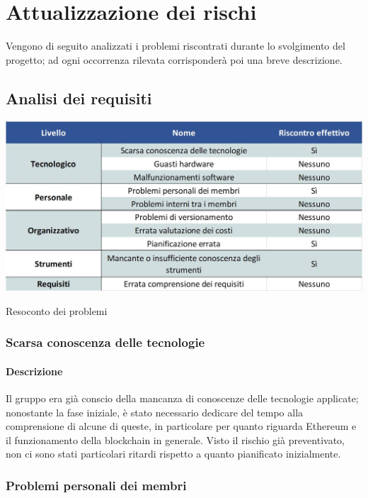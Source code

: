 \newpage

\section{Attualizzazione dei rischi} \label{RiscontroRischi}

Vengono di seguito analizzati i problemi riscontrati durante lo svolgimento del progetto; ad ogni occorrenza rilevata corrisponderà poi una breve descrizione.\\

\subsection{Analisi dei requisiti}
\begin{table}[h!]
	\centerline{\includegraphics[scale=0.55]{img/RiscontroProblemi.jpg}}
	\caption{Resoconto dei problemi}
	\label{fig:resoconto_probl}
\end{table}

\subsubsection{Scarsa conoscenza delle tecnologie}
\paragraph {Descrizione}
Il gruppo era già conscio della mancanza di conoscenze delle tecnologie applicate; nonostante la fase iniziale, è stato necessario dedicare del tempo alla comprensione di alcune di queste, in particolare per quanto riguarda Ethereum e il funzionamento della blockchain in generale. Visto il rischio già preventivato, non ci sono stati particolari ritardi rispetto a quanto pianificato inizialmente.

\subsubsection{Problemi personali dei membri}
